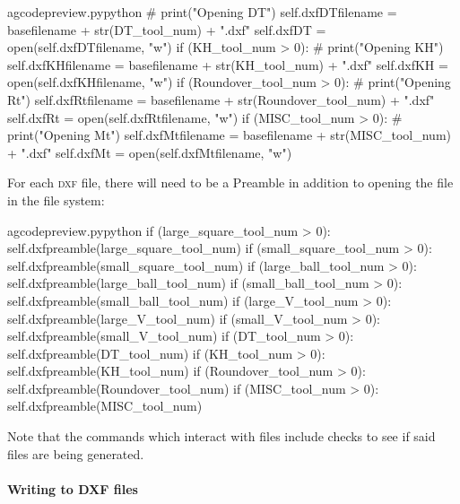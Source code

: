 \documentclass{ltxdoc}
\begin{document}
\begin{writecode}{a}{gcodepreview.py}{python}
#                print("Opening DT")
                self.dxfDTfilename = basefilename + str(DT_tool_num) + ".dxf"
                self.dxfDT = open(self.dxfDTfilename, "w")
            if (KH_tool_num > 0):
#                print("Opening KH")
                self.dxfKHfilename = basefilename + str(KH_tool_num) + ".dxf"
                self.dxfKH = open(self.dxfKHfilename, "w")
            if (Roundover_tool_num > 0):
#                print("Opening Rt")
                self.dxfRtfilename = basefilename + str(Roundover_tool_num) + ".dxf"
                self.dxfRt = open(self.dxfRtfilename, "w")
            if (MISC_tool_num > 0):
#                print("Opening Mt")
                self.dxfMtfilename = basefilename + str(MISC_tool_num) + ".dxf"
                self.dxfMt = open(self.dxfMtfilename, "w")
\end{writecode}
\addtocounter{gcpy}{93}

For each \textsc{dxf} file, there will need to be a Preamble in addition to opening the file in the file system:

\lstset{firstnumber=\thegcpy}
\begin{writecode}{a}{gcodepreview.py}{python}
            if (large_square_tool_num > 0):
                self.dxfpreamble(large_square_tool_num)
            if (small_square_tool_num > 0):
                self.dxfpreamble(small_square_tool_num)
            if (large_ball_tool_num > 0):
                self.dxfpreamble(large_ball_tool_num)
            if (small_ball_tool_num > 0):
                self.dxfpreamble(small_ball_tool_num)
            if (large_V_tool_num > 0):
                self.dxfpreamble(large_V_tool_num)
            if (small_V_tool_num > 0):
                self.dxfpreamble(small_V_tool_num)
            if (DT_tool_num > 0):
                self.dxfpreamble(DT_tool_num)
            if (KH_tool_num > 0):
                self.dxfpreamble(KH_tool_num)
            if (Roundover_tool_num > 0):
                self.dxfpreamble(Roundover_tool_num)
            if (MISC_tool_num > 0):
                self.dxfpreamble(MISC_tool_num)

\end{writecode}
\addtocounter{gcpy}{21}

Note that the commands which interact with files include checks to see if said files are being generated.

\paragraph{Writing to DXF files}
 
\end{document}
